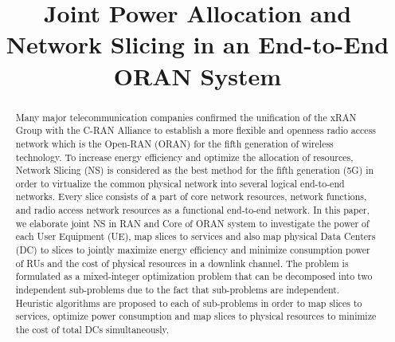 \documentclass[conference]{IEEEtran}
\begin{document}
\title{Joint Power Allocation and Network Slicing in an End-to-End ORAN System \vspace{-.1cm}
}
%
  \author{
  }

\maketitle

\begin{abstract}
Many major telecommunication companies confirmed the unification of the xRAN Group with the C-RAN Alliance to establish a more flexible and openness radio access network which is the Open-RAN
(ORAN) for the fifth generation of wireless technology. To increase energy efficiency and optimize the allocation of resources, Network Slicing (NS) is considered as the best method for the fifth generation (5G) in order to virtualize the common physical network into several logical end-to-end networks. Every slice consists of a part of core network resources, network functions, and radio access network resources as a functional end-to-end network. In this paper, we elaborate joint NS in RAN and Core of ORAN system to investigate the power
of each User Equipment (UE), map slices to services and also map physical Data Centers (DC) to slices to jointly maximize energy efficiency and minimize consumption power of RUs and the cost of  physical resources in a downlink channel. The problem is formulated as a mixed-integer optimization problem that can be decomposed into two independent sub-problems due to the fact that sub-problems are independent.
Heuristic algorithms are proposed to each of sub-problems in order to map slices to services, optimize power consumption and map slices to physical resources to minimize the cost of total DCs simultaneously.
\end{abstract}
\end{document}
